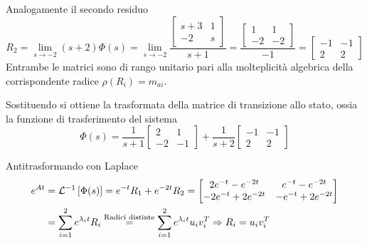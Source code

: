 Analogamente il secondo residuo
$$
R_2 = \lim_{s\to -2} (s+2) \Phi(s) = \lim_{s\to -2} \frac{
\begin{bmatrix}
 s+3 & 1 \\ -2 & s
\end{bmatrix}
}{s+1} =
\frac{
\begin{bmatrix}
 1 & 1 \\ -2 & -2
\end{bmatrix}
}{-1} = \begin{bmatrix}
 -1 & -1 \\ 2 & 2
\end{bmatrix}
$$
Entrambe le matrici sono di rango unitario pari alla molteplicità
algebrica della corrispondente radice $\rho(R_i) = m_{ai}$.

Sostituendo si ottiene la trasformata della matrice di transizione allo stato,
ossia la funzione di trasferimento del sistema
$$
\Phi(s) = \frac{1}{s+1}
\begin{bmatrix}
 2 & 1 \\ -2 & -1
\end{bmatrix}
+ \frac{1}{s+2}
\begin{bmatrix}
 -1 & -1 \\ 2 & 2
\end{bmatrix}
$$

Antitrasformando con Laplace
$$\begin{aligned}
e^{At} &= \mathcal{L}^{-1} \left[\Phi(s)\right] = e^{-t}R_1 + e^{-2t} R_2 =
\begin{bmatrix}
 2e^{-t}-e^{-2t} & e^{-t}-e^{-2t} \\
 -2e^{-t}+2e^{-2t} & -e^{-t}+2e^{-2t}
\end{bmatrix}\\
&=\sum_{i=1}^2 e^{\lambda_i t} R_i \stackrel{\text{Radici distinte}}{=}
\sum_{i=1}^2 e^{\lambda_i t}u_iv_i^T\Rightarrow R_i = u_iv_i^T
\end{aligned}$$

